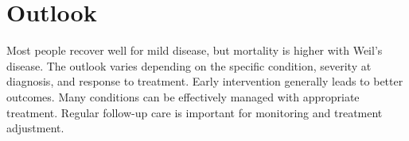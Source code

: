 \section{Outlook}
Most people recover well for mild disease, but mortality is higher with Weil's disease. The outlook varies depending on the specific condition, severity at diagnosis, and response to treatment. Early intervention generally leads to better outcomes. Many conditions can be effectively managed with appropriate treatment. Regular follow-up care is important for monitoring and treatment adjustment.
